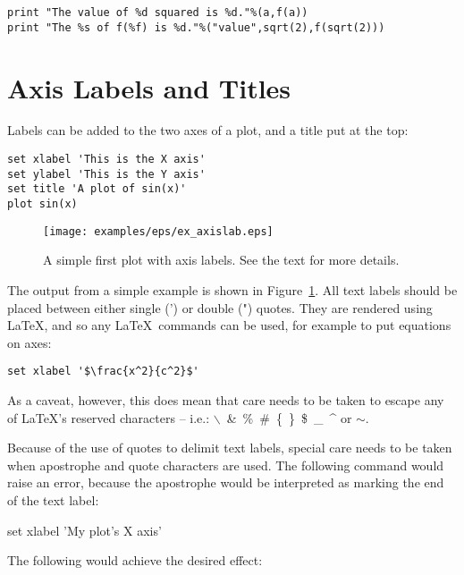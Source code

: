 \begin{verbatim}
print "The value of %d squared is %d."%(a,f(a))
print "The %s of f(%f) is %d."%("value",sqrt(2),f(sqrt(2)))
\end{verbatim}

\section{Axis Labels and Titles}
\label{sec:latex_incompatibility}

Labels can be added to the two axes of a plot, and a title put at the top:

\begin{verbatim}
set xlabel 'This is the X axis'
set ylabel 'This is the Y axis'
set title 'A plot of sin(x)'
plot sin(x)
\end{verbatim}

\begin{figure}
\begin{center}
\texttt{[image: examples/eps/ex\_axislab.eps]}
\end{center}
\caption{A simple first plot with axis labels. See the text for more details.}
\label{fig:ex_axislab}
\end{figure}

\noindent The output from a simple example is shown in
Figure~\ref{fig:ex_axislab}. All text labels should be placed between either
single (') or double (") quotes. They are rendered using \LaTeX, and so any
\LaTeX\ commands can be used, for example to put equations on axes:

\begin{verbatim}
set xlabel '$\frac{x^2}{c^2}$'
\end{verbatim}

\noindent As a caveat, however, this does mean that care needs to be taken to
escape any of \LaTeX's reserved characters -- i.e.:
$\backslash$~\&~\%~\#~\{~\}~\$~\_~\^{} or $\sim$.

Because of the use of quotes to delimit text labels, special care needs to be
taken when apostrophe and quote characters are used. The following command
would raise an error, because the apostrophe would be interpreted as marking
the end of the text label:

\begin{dontdo}
set xlabel 'My plot's X axis'
\end{dontdo}

\noindent The following would achieve the desired effect:

